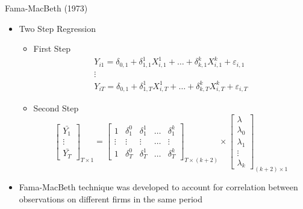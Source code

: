 \documentclass{beamer}
\begin{document}
	\begin{frame}{Fama-MacBeth (1973)}
		\begin{itemize}
			
			\item Two Step Regression
			\begin{itemize}
				\item First Step
				\begin{equation*}
					\begin{array}{c}
						Y_{i1} = \delta_{0,1} + \delta_{1,1}^1 X^1_{i,1} + \dots  + \delta_{k,1}^k X^k_{i,1}  + \varepsilon_{i,1}\\
						\vdots\\
						Y_{iT} = \delta_{0,1} + \delta_{1,T}^1 X^1_{i,T} + \dots  + \delta_{k,T}^k X^k_{i,T}  + \varepsilon_{i,T}
					\end{array}
				\end{equation*}
				
				
				
				\item Second Step
				\begin{equation*}
					\left[\begin{matrix}
						\bar{Y_1}\\
						\vdots\\
						\bar{Y_T}
					\end{matrix}\right]_{T\times 1} =
					\left[\begin{matrix}
						1 &  \delta_1^0 &  \delta_1^1 & \dots  &  \delta_1^k\\
						\vdots&  \vdots &  \vdots &  \dots &  \vdots\\
						1 &  \delta_T^0 &  \delta_T^1 & \dots &  \delta_T^k
					\end{matrix}\right]_{T\times (k+2)}
					\times \left[\begin{matrix}
						\lambda\\
						\lambda_0\\
						\lambda_1\\
						\vdots\\
						\lambda_k
					\end{matrix}\right] _{(k+2)\times 1}
				\end{equation*}
				
				
			\end{itemize}
			\item Fama-MacBeth technique was
			developed to account for correlation between observations on different firms in the same period
		\end{itemize}
	\end{frame}
	
\end{document}
